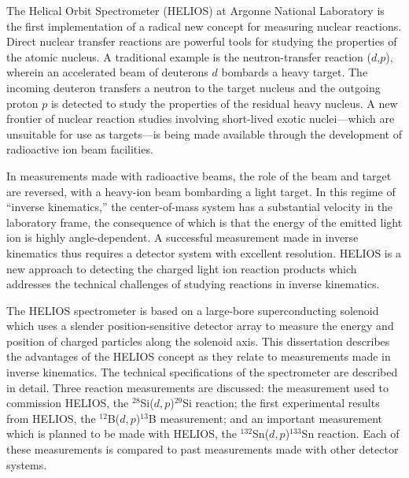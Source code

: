  The Helical Orbit Spectrometer (HELIOS) at Argonne National Laboratory is the first implementation of a radical new  concept for measuring nuclear reactions.  
 Direct nuclear transfer reactions are %
   powerful tools for studying the properties of the atomic nucleus. A   traditional example %
    is the neutron-transfer reaction ($d$,$p$), wherein an accelerated beam of deuterons $d$ bombards a heavy target.  The incoming deuteron transfers a neutron to the target nucleus and the outgoing proton $p$ is detected to study the properties of the residual heavy nucleus.  A new frontier of nuclear reaction studies involving short-lived exotic  nuclei---which are unsuitable for use as targets---is being made available through the development of radioactive ion beam facilities.

In measurements made with radioactive beams, the role of the beam and target are reversed, with a heavy-ion beam
bombarding a light target.  In this regime of ``inverse kinematics,''
the center-of-mass system %
has a substantial velocity in the
laboratory frame,  
the consequence of which %
 is that %
the energy of the emitted light
ion is highly angle-dependent.  A successful measurement made in inverse kinematics thus requires a detector system with excellent resolution.
HELIOS is a new approach to detecting the charged light ion reaction products which addresses the technical challenges of studying reactions in inverse kinematics.

The HELIOS spectrometer is based on a large-bore superconducting solenoid %
 which uses a slender po\-si\-tion-\-sen\-si\-tive detector array to measure the energy and position of charged particles along the solenoid axis.  This dissertation describes the %
 advantages of the HELIOS concept as they relate to measurements made in inverse kinematics.  The technical specifications of the spectrometer are described in detail.  Three reaction measurements are discussed: the measurement used to commission HELIOS, the $^{28}$Si($d,p$)$^{29}$Si reaction; the first experimental results from HELIOS, the $^{12}$B($d,p$)$^{13}$B measurement; and an important measurement which is planned to be made with HELIOS, the $^{132}$Sn($d,p$)$^{133}$Sn reaction.  Each of these measurements is compared to past measurements made with other detector systems. 